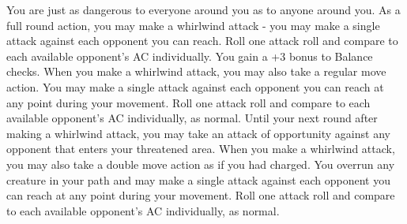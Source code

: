 {You are just as dangerous to everyone around you as to anyone around you.}
{As a full round action, you may make a whirlwind attack - you may make a single attack against each opponent you can reach. Roll one attack roll and compare to each available opponent's AC individually.}
{You gain a +3 bonus to Balance checks.}
{When you make a whirlwind attack, you may also take a regular move action. You may make a single attack against each opponent you can reach at any point during your movement. Roll one attack roll and compare to each available opponent's AC individually, as normal.}
{Until your next round after making a whirlwind attack, you may take an attack of opportunity against any opponent that enters your threatened area.}
{When you make a whirlwind attack, you may also take a double move action as if you had charged. You overrun any creature in your path and may make a single attack against each opponent you can reach at any point during your movement. Roll one attack roll and compare to each available opponent's AC individually, as normal.}